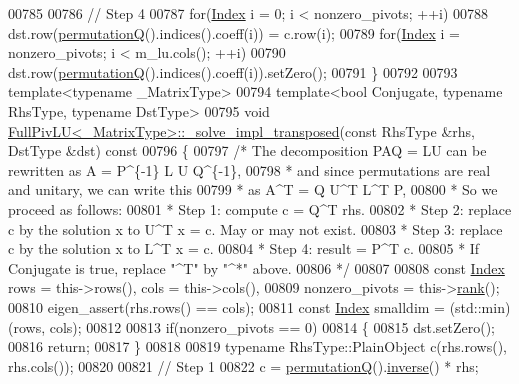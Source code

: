 \begin{DoxyCode}
00785 
00786   \textcolor{comment}{// Step 4}
00787   \textcolor{keywordflow}{for}(\hyperlink{namespace_eigen_a62e77e0933482dafde8fe197d9a2cfde}{Index} i = 0; i < nonzero\_pivots; ++i)
00788     dst.row(\hyperlink{group___l_u___module_a8d18190c7618de271cba7293f0493a36}{permutationQ}().indices().coeff(i)) = c.row(i);
00789   \textcolor{keywordflow}{for}(\hyperlink{namespace_eigen_a62e77e0933482dafde8fe197d9a2cfde}{Index} i = nonzero\_pivots; i < m\_lu.cols(); ++i)
00790     dst.row(\hyperlink{group___l_u___module_a8d18190c7618de271cba7293f0493a36}{permutationQ}().indices().coeff(i)).setZero();
00791 \}
00792 
00793 \textcolor{keyword}{template}<\textcolor{keyword}{typename} \_MatrixType>
00794 \textcolor{keyword}{template}<\textcolor{keywordtype}{bool} Conjugate, \textcolor{keyword}{typename} RhsType, \textcolor{keyword}{typename} DstType>
00795 \textcolor{keywordtype}{void} \hyperlink{group___l_u___module_class_eigen_1_1_full_piv_l_u}{FullPivLU<\_MatrixType>::\_solve\_impl\_transposed}(\textcolor{keyword}{const} 
      RhsType &rhs, DstType &dst)\textcolor{keyword}{ const}
00796 \textcolor{keyword}{}\{
00797   \textcolor{comment}{/* The decomposition PAQ = LU can be rewritten as A = P^\{-1\} L U Q^\{-1\},}
00798 \textcolor{comment}{   * and since permutations are real and unitary, we can write this}
00799 \textcolor{comment}{   * as   A^T = Q U^T L^T P,}
00800 \textcolor{comment}{   * So we proceed as follows:}
00801 \textcolor{comment}{   * Step 1: compute c = Q^T rhs.}
00802 \textcolor{comment}{   * Step 2: replace c by the solution x to U^T x = c. May or may not exist.}
00803 \textcolor{comment}{   * Step 3: replace c by the solution x to L^T x = c.}
00804 \textcolor{comment}{   * Step 4: result = P^T c.}
00805 \textcolor{comment}{   * If Conjugate is true, replace "^T" by "^*" above.}
00806 \textcolor{comment}{   */}
00807 
00808   \textcolor{keyword}{const} \hyperlink{namespace_eigen_a62e77e0933482dafde8fe197d9a2cfde}{Index} rows = this->rows(), cols = this->cols(),
00809     nonzero\_pivots = this->\hyperlink{group___l_u___module_a67a870aa69e699e058d04802ba0bdad9}{rank}();
00810    eigen\_assert(rhs.rows() == cols);
00811   \textcolor{keyword}{const} \hyperlink{namespace_eigen_a62e77e0933482dafde8fe197d9a2cfde}{Index} smalldim = (std::min)(rows, cols);
00812 
00813   \textcolor{keywordflow}{if}(nonzero\_pivots == 0)
00814   \{
00815     dst.setZero();
00816     \textcolor{keywordflow}{return};
00817   \}
00818 
00819   \textcolor{keyword}{typename} RhsType::PlainObject c(rhs.rows(), rhs.cols());
00820 
00821   \textcolor{comment}{// Step 1}
00822   c = \hyperlink{group___l_u___module_a8d18190c7618de271cba7293f0493a36}{permutationQ}().\hyperlink{group___core___module_adb9af427f317202366c2832876064eb3}{inverse}() * rhs;

\end{DoxyCode}
